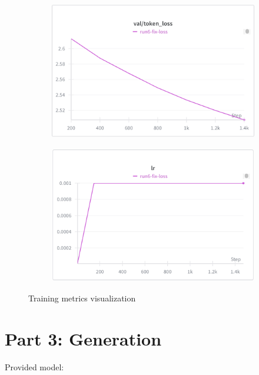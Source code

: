 \documentclass[11pt,a4paper]{article}
\begin{document}
\begin{figure}[h!]
    \begin{subfigure}[b]{0.48\textwidth}
        \centering
        \includegraphics[width=\textwidth]{val_loss.png}
        \label{fig:val_loss}
    \end{subfigure}
    \hfill
    \begin{subfigure}[b]{0.48\textwidth}
        \centering
        \includegraphics[width=\textwidth]{lr.png}
        \label{fig:lr}
    \end{subfigure}
    
    \caption{Training metrics visualization}
    \label{fig:training_metrics}
\end{figure}

\section{Part 3: Generation}


Provided model:
\end{document}
